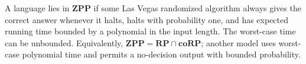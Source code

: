 
A language lies in $\mathbf{ZPP}$ if some Las Vegas randomized algorithm always gives the correct answer whenever it halts, halts with probability one, and has expected running time bounded by a polynomial in the input length. The worst-case time can be unbounded. Equivalently, $\mathbf{ZPP}=\mathbf{RP}\cap\mathbf{coRP}$; another model uses worst-case polynomial time and permits a no-decision output with bounded probability.
